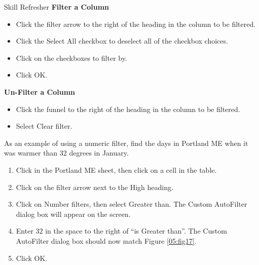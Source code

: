 \begin{center}
	\begin{sklbox}{Skill Refresher}
		\textbf{Filter a Column}
		\\
		\begin{itemize}
			\setlength{\itemsep}{0pt}
			\setlength{\parskip}{0pt}
			\setlength{\parsep}{0pt}

			\item Click the filter arrow to the right of the heading in the column to be filtered.
			\item Click the Select All checkbox to deselect all of the checkbox choices.
			\item Click on the checkboxes to filter by.
			\item Click OK.
			
		\end{itemize}
		
		\bigskip
		\textbf{Un-Filter a Column}
		
		\begin{itemize}
			\setlength{\itemsep}{0pt}
			\setlength{\parskip}{0pt}
			\setlength{\parsep}{0pt}
			
			\item Click the funnel to the right of the heading in the column to be filtered.
			\item Select Clear filter.
			
		\end{itemize}
	\end{sklbox}
\end{center}

As an example of using a numeric filter, find the days in Portland ME when it was warmer than $ 32 $ degrees in January.

\begin{enumerate}
	\item Click in the Portland ME sheet, then click on a cell in the table.
	\item Click on the filter arrow next to the High heading.
	\item Click on Number filters, then select Greater than. The Custom AutoFilter dialog box will appear on the screen.
	\item Enter $ 32 $ in the space to the right of ``is Greater than''. The Custom AutoFilter dialog box should now match Figure \ref{05:fig17}.
	\item Click OK.
\end{enumerate}


